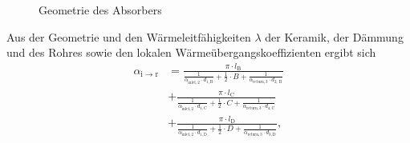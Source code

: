 \begin{figure}[h!]
    \centering
    \setlength{\fboxsep}{1pt}
    \setlength{\fboxrule}{1pt}
    \caption[Geometrie des Absorbers]{Geometrie des Absorbers \cite[S.97]{DissGall}}
    \label{fig_GeometrieAbsorber}
\end{figure}

Aus der Geometrie und den Wärmeleitfähigkeiten $\lambda$ der Keramik, der Dämmung und des Rohres sowie den lokalen Wärmeübergangskoeffizienten ergibt sich
\begin{equation}
\begin{aligned} \label{eq_WärmeübergangskoeffizientVerluste}
\alpha_{\mathrm{i\to r}} & =\frac{\pi \cdot l_{\mathrm{B}}}{\frac{1}{\alpha_{\mathrm{inlet, 2}} \cdot d_{1, \mathrm{B}}}+\frac{1}{2} \cdot B+\frac{1}{\alpha_{\mathrm{return, 3}} \cdot d_{2, \mathrm{~B}}}} \\
& +\frac{\pi \cdot l_{\mathrm{C}}}{\frac{1}{\alpha_{\mathrm{inlet, 2}} \cdot d_{1, \mathrm{C}}}
        +\frac{1}{2} \cdot C+\frac{1}{\alpha_{\mathrm{return, 3}} \cdot d_{4, \mathrm{C}}}}
\\
& +\frac{\pi \cdot l_{\mathrm{D}}}{\frac{1}{\alpha_{\mathrm{inlet, 2}} \cdot d_{1, \mathrm{D}}}+\frac{1}{2} \cdot D+\frac{1}{\alpha_{\mathrm{return, 3}} \cdot d_{3, \mathrm{D}}}},
\end{aligned}
\end{equation}

